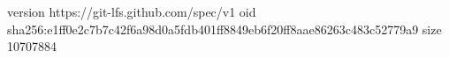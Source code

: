 version https://git-lfs.github.com/spec/v1
oid sha256:e1ff0e2c7b7c42f6a98d0a5fdb401ff8849eb6f20ff8aae86263c483c52779a9
size 10707884
